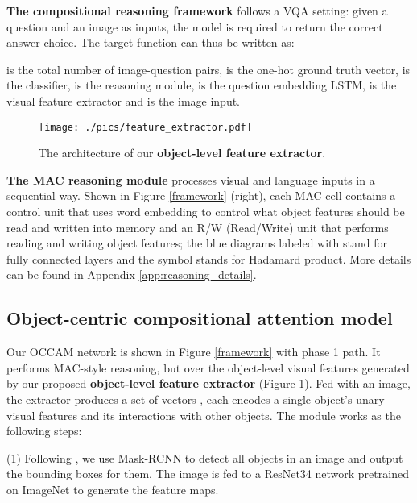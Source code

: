 \documentclass[10pt,twocolumn,letterpaper]{article}
\begin{document}
\textbf{The compositional reasoning framework} follows a VQA setting: given a question and an image as inputs, the model is required to return the correct answer choice. The target function can thus be written as:

 is the total number of image-question pairs,  is the one-hot ground truth vector,  is the classifier,  is the reasoning module,  is the question embedding LSTM,  is the visual feature extractor and  is the image input.



\begin{figure}[t]
\centering
\texttt{[image: ./pics/feature\_extractor.pdf]}
\caption{\small{The architecture of our \textbf{object-level feature extractor}.}}
\label{ext}
\vspace{-5mm}
\end{figure}

\textbf{The MAC reasoning module} \cite{hudson2018compositional}
processes visual and language inputs in a sequential way. 
Shown in Figure \ref{framework} (right), each MAC cell contains a control unit that uses word embedding to control what object features should be read and written into memory and an R/W (Read/Write) unit that performs reading and writing object features; the blue diagrams labeled with  stand for fully connected layers and the symbol  stands for Hadamard product. 
More details can be found in Appendix \ref{app:reasoning_details}.










\vspace{-2mm}
\subsection{Object-centric compositional attention model}
\vspace{-2mm}
\label{ssec:object_mac}
Our OCCAM network is shown in Figure \ref{framework} with phase 1 path.
It performs MAC-style reasoning, but over the object-level visual features generated by our proposed \textbf{object-level feature extractor} (Figure \ref{ext}).
Fed with an image, the extractor produces a set of vectors , each encodes a single object's unary visual features and its interactions with other objects. The module works as the following steps:

(1) Following \cite{mao2018neuro}, we use Mask-RCNN \cite{he2017mask} to detect all objects in an image and output the bounding boxes for them. 
The image is fed to a ResNet34 network \cite{He_2016_CVPR} pretrained on ImageNet \cite{deng2009imagenet} to generate the feature maps.
\end{document}

